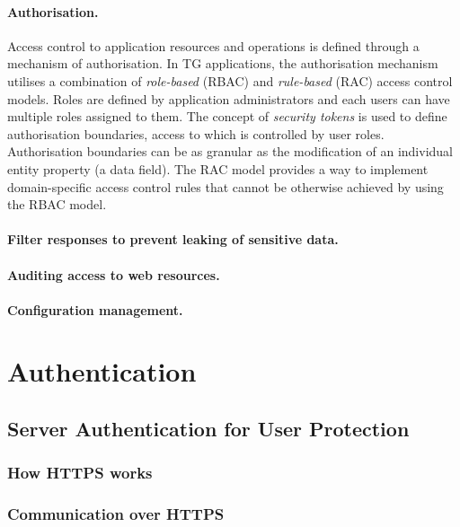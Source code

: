 \documentclass[a4paper,12pt,oneside,openright]{memoir}
\begin{document}
	\paragraph{Authorisation.}
		Access control to application resources and operations is defined through a mechanism of authorisation.
	  	In TG applications, the authorisation mechanism utilises a combination of \emph{role-based} (RBAC) and \emph{rule-based} (RAC) access control models.
		Roles are defined by application administrators and each users can have multiple roles assigned to them.
		The concept of \emph{security tokens} is used to define authorisation boundaries, access to which is controlled by user roles.
		Authorisation boundaries can be as granular as the modification of an individual entity property (a data field).
		The RAC model provides a way to implement domain-specific access control rules that cannot be otherwise achieved by using the RBAC model.

	\paragraph{Filter responses to prevent leaking of sensitive data.}

	\paragraph{Auditing access to web resources.}

	\paragraph{Configuration management.}


\section*{Authentication}

\subsection*{Server Authentication for User Protection}

\subsubsection*{How HTTPS works}

\subsubsection*{Communication over HTTPS}
\end{document}
